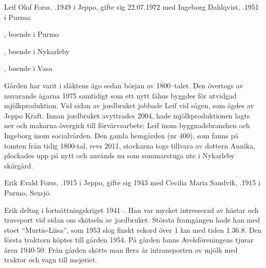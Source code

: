 


Leif Olof Forss, .1949 i Jeppo, gifte sig 22.07.1972 med Ingeborg Dahlqvist, .1951 i Purmo.
\begin{jhchildren}
  \item {}, boende i Purmo
  \item {}, boende i Nykarleby
  \item {}, boende i Vasa
\end{jhchildren}

Gården har varit i släktens ägo sedan början av 1800--talet. Den övertogs av nuvarande ägarna 1975 samtidigt som ett nytt fähus byggdes för utvidgad mjölkproduktion. Vid sidan av jordbruket jobbade Leif vid sågen, som ägdes av Jeppo Kraft. Innan jordbruket avyttrades 2004, hade mjölkproduktionen lagts ner och makarna övergick till förvärvsarbete; Leif inom byggnadsbranchen och Ingeborg inom socialvården. Den gamla hemgården (nr 400), som fanns på tomten från tidig 1800-tal, revs 2011, stockarna togs tillvara av dottern Annika, plockades upp på nytt och används nu som sommarstuga ute i Nykarleby skärgård.


Erik Evald Forss, .1915 i Jeppo, gifte sig 1943 med Cecilia Maria Sandvik, .1915 i Purmo, Sexsjö.
\begin{jhchildren}
  \item {}
  \item {}
  \item {}
  \item {}
\end{jhchildren}

Erik deltog i fortsättningskriget 1941--. Han var mycket intresserad av hästar och travsport vid sidan om skötseln av jordbruket. Största framgången hade han med  stoet ``Murtis-Liisa'', som 1953 slog finskt rekord över 1 km med tiden 1.36.8. Den första traktorn köptes till gården 1954. På gården fanns Avelsföreningens tjurar åren 1940-50. Från gården skötte man flera år intransporten av mjölk med traktor och vagn till mejeriet.

